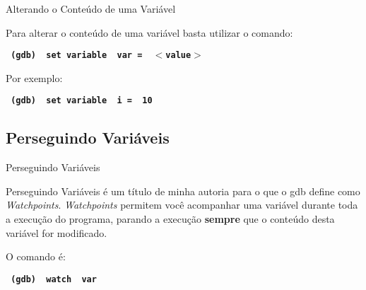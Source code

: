 \begin{frame}{Alterando o Conteúdo de uma Variável}

    Para alterar o conteúdo de uma variável basta utilizar o comando:
    
    \begin{center}
        \small
        \texttt{ \textbf{ (gdb) {\color{blue} set variable} {\color{red} var = } $<${\color{dartmouthgreen}value}$>$ }}
    \end{center}

    Por exemplo:
    
    \begin{center}
        \small
        \texttt{ \textbf{ (gdb) {\color{blue} set variable} {\color{red} i = } {\color{dartmouthgreen}10} }}
    \end{center}
    
\end{frame}

\subsection{ Perseguindo Variáveis }
\frame{\tableofcontents[
    currentsection,
    currentsubsection,
    subsectionstyle=show/shaded/hide
]}
\begin{frame}{Perseguindo Variáveis}

    Perseguindo Variáveis é um título de minha autoria para o que o gdb define como \textit{Watchpoints}. \textit{Watchpoints} permitem você acompanhar uma variável durante toda a execução do programa, parando a execução \textbf{sempre} que o conteúdo desta variável for modificado.
    
    O comando é:
    
    \begin{center}
        \small
        \texttt{ \textbf{ (gdb) {\color{blue} watch} {\color{red} var} } }
    \end{center}

\end{frame}

